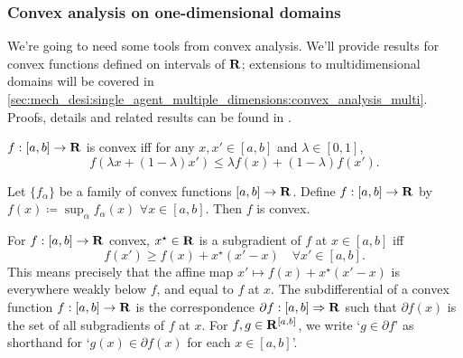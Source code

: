 \documentclass[11pt,letterpaper,reqno,oneside]{article}
\begin{document}
\subsubsection{Convex analysis on one-dimensional domains}
\label{sec:mech_desi:single_agent_one_dimension:convex_analysis}

We're going to need some tools from convex analysis. We'll provide results for convex functions defined on intervals of $\mathbf{R}$; extensions to multidimensional domains will be covered in \cref{sec:mech_desi:single_agent_multiple_dimensions:convex_analysis_multi}. Proofs, details and related results can be found in \textcite{Rockafellar1970}.

\begin{definition}
	$f : [a,b] \to \mathbf{R}$ is convex iff for any $x,x' \in [a,b]$ and $\lambda \in [0,1]$,
	\begin{equation*}
		f( \lambda x + (1-\lambda) x' ) \leq \lambda f(x) + (1-\lambda) f(x') .
	\end{equation*}
\end{definition}


\begin{proposition}
	\label{proposition:convex_preserved_1d}
	Let $\{ f_\alpha \}$ be a family of convex functions $[a,b] \to \mathbf{R}$. Define $f : [a,b] \to \mathbf{R}$ by $f(x) \coloneqq \sup_\alpha f_\alpha(x)$ $\forall x \in [a,b]$. Then $f$ is convex.
\end{proposition}
%


For $f : [a,b] \to \mathbf{R}$ convex, $x^\star \in \mathbf{R}$ is a subgradient of $f$ at $x \in [a,b]$ iff
%
\begin{equation*}
	f(x') \geq f(x) + x^\star (x'-x)
	\quad\forall x' \in [a,b] .
\end{equation*}
%
This means precisely that the affine map $x' \mapsto f(x) + x^\star (x'-x)$ is everywhere weakly below $f$, and equal to $f$ at $x$. The subdifferential of a convex function $f : [a,b] \to \mathbf{R}$ is the correspondence $\partial f : [a,b] \Rightarrow \mathbf{R}$ such that $\partial f(x)$ is the set of all subgradients of $f$ at $x$. For $f,g \in \mathbf{R}^{[a,b]}$, we write `$g \in \partial f$' as shorthand for `$g(x) \in \partial f(x)$ for each $x \in [a,b]$'.
\end{document}
